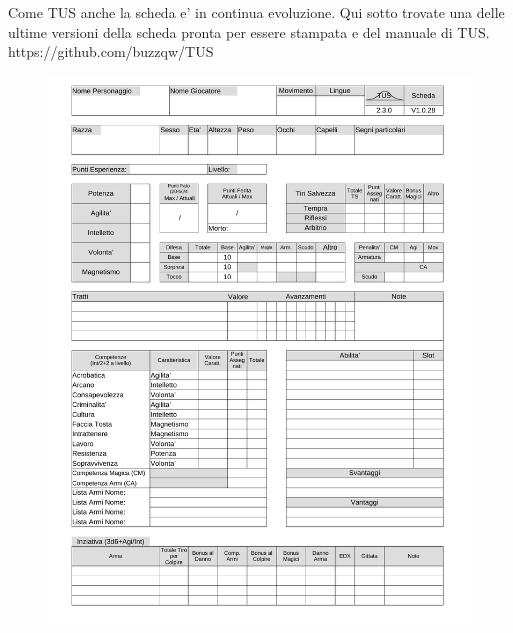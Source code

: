 \documentclass[a4paper,11pt,twoside,openany]{dndbook}
\begin{document}
Come TUS anche la scheda e' in continua evoluzione. Qui sotto trovate una delle ultime versioni della scheda pronta per essere stampata e del manuale di TUS. https://github.com/buzzqw/TUS

\begin{figure}
	\includegraphics[width=21cm]{TUS-Scheda-1.png}
\end{figure}
\end{document}
